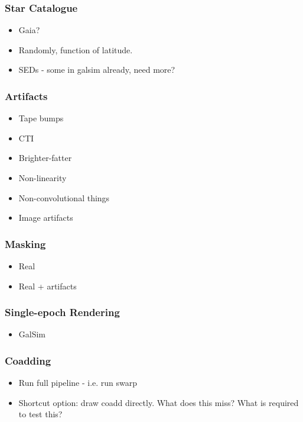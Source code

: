 \documentclass[\docopts]{\docclass}
\begin{document}
\subsubsection{Star Catalogue}

\begin{itemize}
\item Gaia?
\item Randomly, function of latitude.
\item SEDs - some in galsim already, need more?
\end{itemize}

\subsubsection{Artifacts}
\begin{itemize}
\item Tape bumps
\item CTI
\item Brighter-fatter
\item Non-linearity
\item Non-convolutional things
\item Image artifacts
\end{itemize}

\subsubsection{Masking}

\begin{itemize}
\item Real
\item Real + artifacts
\end{itemize}

\subsubsection{Single-epoch Rendering}

\begin{itemize}
\item GalSim
\end{itemize}

\subsubsection{Coadding}
\begin{itemize}
\item Run full pipeline - i.e. run swarp
\item Shortcut option: draw coadd directly. What does this miss? What is required to test this?
\end{itemize}
\end{document}
